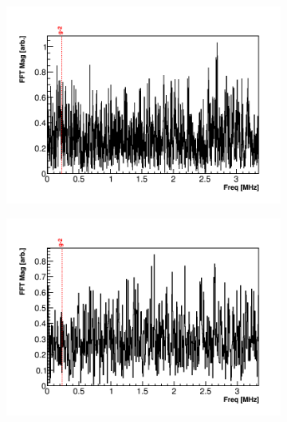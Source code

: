 \begin{figure}[]
    \begin{subfigure}[t]{0.45\textwidth}
        \centering
        \includegraphics[width=\textwidth]{FFT_RMethod}
        \caption{}
    \end{subfigure}
    \hspace{1mm}
    \begin{subfigure}[t]{0.45\textwidth}
        \centering
        \includegraphics[width=\textwidth]{FFT_QMethod}
        \caption{}
    \end{subfigure}
\caption[]{}
\label{fig:}
\end{figure}


